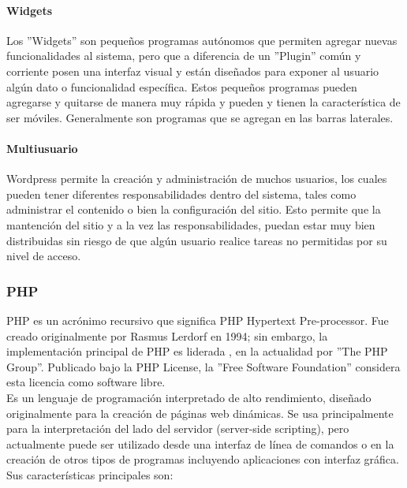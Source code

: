 \paragraph{Widgets}
Los ''Widgets'' son pequeños programas autónomos que permiten agregar nuevas funcionalidades al sistema, pero que a diferencia de un ''Plugin'' común y corriente posen una interfaz visual y están diseñados para exponer al usuario algún dato o funcionalidad específica. Estos pequeños programas pueden agregarse y quitarse de manera muy rápida y pueden y tienen la característica de ser móviles. Generalmente son programas que se agregan en las barras laterales.

\paragraph{Multiusuario}
Wordpress permite la creación y administración de muchos usuarios, los cuales pueden tener diferentes responsabilidades dentro del sistema, tales como administrar el contenido o bien la configuración del sitio. Esto permite que la mantención del sitio y a la vez las responsabilidades, puedan estar muy bien distribuidas sin riesgo de que algún usuario realice tareas no permitidas por su nivel de acceso.

\subsubsection{PHP}
PHP es un acrónimo recursivo que significa PHP Hypertext Pre-processor. Fue creado originalmente por Rasmus Lerdorf en 1994; sin embargo, la implementación principal de PHP es liderada , en la actualidad por ''The PHP Group\cite{php:1}''. Publicado bajo la PHP License, la ''Free Software Foundation'' considera esta licencia como software libre.\\

Es un lenguaje de programación interpretado de alto rendimiento, diseñado originalmente para la creación de páginas web dinámicas. Se usa principalmente para la interpretación del lado del servidor (server-side scripting), pero actualmente puede ser utilizado desde una interfaz de línea de comandos o en la creación de otros tipos de programas incluyendo aplicaciones con interfaz gráfica. Sus características principales son:

